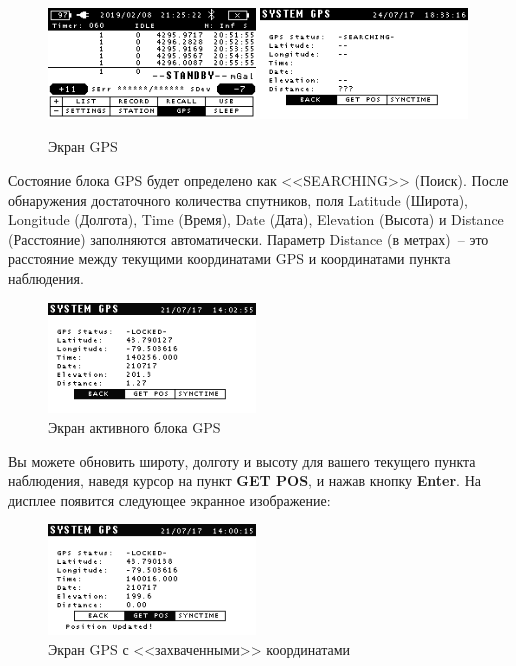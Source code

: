 \begin{figure}[h]
  \centering
  \includegraphics[width=0.49\textwidth]{figures/the_gps_screen_1}
  \includegraphics[width=0.49\textwidth]{figures/the_gps_screen_2}
  \caption{Экран GPS}
  \label{fig:the_gps_screen_2}
\end{figure}

Состояние блока GPS будет определено как <<SEARCHING>> (Поиск). После
обнаружения достаточного количества спутников, поля Latitude (Широта), Longitude
(Долгота), Time (Время), Date (Дата), Elevation (Высота) и Distance
(Расстояние) заполняются автоматически. Параметр Distance (в метрах)~-- это
расстояние между текущими координатами GPS и координатами пункта наблюдения.

\begin{figure}[h]
  \centering
  \includegraphics[width=0.49\textwidth]{figures/the_gps_active_screen}
  \caption{Экран активного блока GPS}
  \label{fig:the_gps_active_screen}
\end{figure}

Вы можете обновить широту, долготу и высоту для вашего текущего пункта
наблюдения, наведя курсор на пункт \textbf{GET POS}, и нажав кнопку
\textbf{Enter}. На дисплее появится следующее экранное изображение:

\begin{figure}[h]
  \centering
  \includegraphics[width=0.49\textwidth]{figures/the_gps_screen_with_locked_positions}
  \caption{Экран GPS с <<захваченными>> координатами}
  \label{fig:the_gps_screen_with_locked_positions}
\end{figure}

